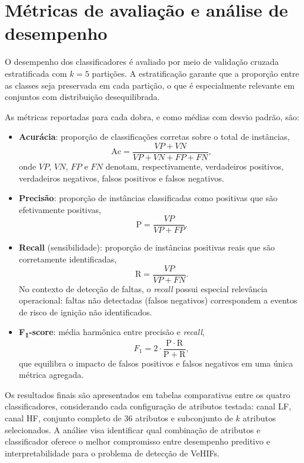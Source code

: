 \section{Métricas de avaliação e análise de desempenho}\label{sec:met_metricas}

O desempenho dos classificadores é avaliado por meio de validação cruzada estratificada com $k = 5$ partições. A estratificação garante que a proporção entre as classes seja preservada em cada partição, o que é especialmente relevante em conjuntos com distribuição desequilibrada.

As métricas reportadas para cada dobra, e como médias com desvio padrão, são:

\begin{itemize}
    \item \textbf{Acurácia}: proporção de classificações corretas sobre o total de instâncias,
    \begin{equation}
        \mathrm{Ac} = \frac{VP + VN}{VP + VN + FP + FN},
        \label{eq:accuracy}
    \end{equation}
    onde $VP$, $VN$, $FP$ e $FN$ denotam, respectivamente, verdadeiros positivos, verdadeiros negativos, falsos positivos e falsos negativos.

    \item \textbf{Precisão}: proporção de instâncias classificadas como positivas que são efetivamente positivas,
    \begin{equation}
        \mathrm{P} = \frac{VP}{VP + FP}.
        \label{eq:precision}
    \end{equation}

    \item \textbf{Recall} (sensibilidade): proporção de instâncias positivas reais que são corretamente identificadas,
    \begin{equation}
        \mathrm{R} = \frac{VP}{VP + FN}.
        \label{eq:recall}
    \end{equation}
    No contexto de detecção de faltas, o \textit{recall} possui especial relevância operacional: faltas não detectadas (falsos negativos) correspondem a eventos de risco de ignição não identificados.

    \item \textbf{F\textsubscript{1}-score}: média harmônica entre precisão e \textit{recall},
    \begin{equation}
        F_1 = 2 \cdot \frac{\mathrm{P} \cdot \mathrm{R}}{\mathrm{P} + \mathrm{R}},
        \label{eq:f1}
    \end{equation}
    que equilibra o impacto de falsos positivos e falsos negativos em uma única métrica agregada.
\end{itemize}

Os resultados finais são apresentados em tabelas comparativas entre os quatro classificadores, considerando cada configuração de atributos testada: canal LF, canal HF, conjunto completo de 36 atributos e subconjunto de $k$ atributos selecionados. A análise visa identificar qual combinação de atributos e classificador oferece o melhor compromisso entre desempenho preditivo e interpretabilidade para o problema de detecção de VeHIFs.
